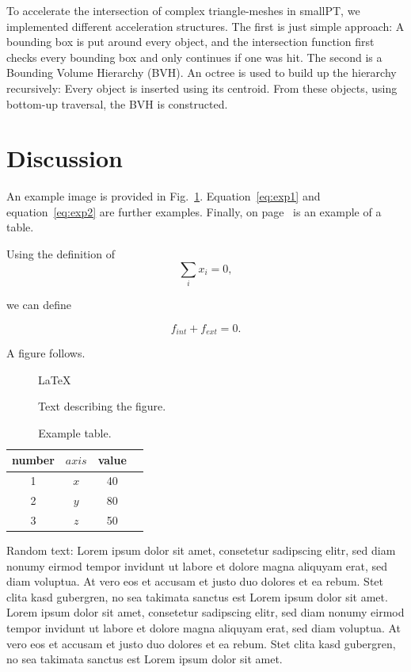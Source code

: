 \documentclass[11pt,a4paper]{article}
\begin{document}
To accelerate the intersection of complex triangle-meshes in smallPT, we implemented different acceleration structures. 
The first is just simple approach: A bounding box is put around every object, and the intersection function first checks every bounding box and only continues if one was hit.
The second is a  Bounding Volume Hierarchy (BVH). An octree is used to build up the hierarchy recursively: Every object is inserted using its centroid. From these objects, using bottom-up traversal, the BVH is constructed. 

\section{Discussion}
\label{sec:discn}

An example image is provided in Fig.~\ref{fig:figure1}.
Equation~\eqref{eq:exp1} and equation~\eqref{eq:exp2} are further examples.
Finally, on page~\pageref{tab:table1} is an example of a table.

Using the definition of
\begin{equation}
  \label{eq:exp1}
  \sum\limits_{i} x_{i} = 0,
\end{equation}

we can define 

\begin{equation}
  \label{eq:exp2}
  f_{int} + f_{ext} = 0.
\end{equation}

A figure follows.

\begin{figure}[h!]
  \centering
  \LaTeX
  \caption{Text describing the figure.}
  \label{fig:figure1}
\end{figure}

\begin{table}[b!]
  \centering
  \begin{tabular}{|c|c|c|c|}
\hline
number & $axis$ & value  \\   \hline
1 &   $x$     & 40    \\   \hline
2 &   $y$     & 80    \\   \hline
3 &   $z$     & 50    \\   \hline
  \end{tabular}
  \caption{Example table.}
  \label{tab:table1}
\end{table}

Random text: Lorem ipsum dolor sit amet, consetetur sadipscing elitr, sed diam nonumy 
eirmod tempor invidunt ut labore et dolore magna aliquyam erat, sed diam voluptua. At 
vero eos et accusam et justo duo dolores et ea rebum. Stet clita kasd gubergren, no sea 
takimata sanctus est Lorem ipsum dolor sit amet. Lorem ipsum dolor sit amet, consetetur 
sadipscing elitr, sed diam nonumy eirmod tempor invidunt ut labore et dolore magna 
aliquyam erat, sed diam voluptua. At vero eos et accusam et justo duo dolores et ea 
rebum. Stet clita kasd gubergren, no sea takimata sanctus est Lorem ipsum dolor sit amet.
\end{document}
